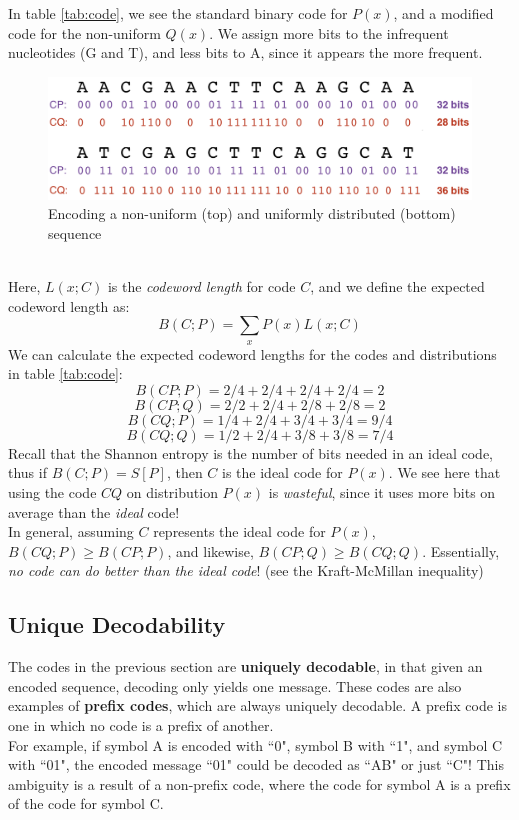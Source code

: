 \documentclass[12pt]{article}
\begin{document}
In table \ref{tab:code}, we see the standard binary code for $P(x)$, and a modified code for the non-uniform $Q(x)$. We assign more bits to the infrequent nucleotides (G and T), and less bits to A, since it appears the more frequent.
\begin{figure}[h]
    \centering
    \includegraphics[width=.7\linewidth]{ideal_code.png}
    \caption{Encoding a non-uniform (top) and uniformly distributed (bottom) sequence}
    \label{fig:my_label}
\end{figure}
\\Here, $L(x; C)$ is the \textit{codeword length} for code $C$, and we define the expected codeword length as:
$$B(C;P) = \sum_xP(x)L(x;C)$$
We can calculate the expected codeword lengths for the codes and distributions in table \ref{tab:code}:
$$B(CP;P) = 2/4 + 2/4 + 2/4 + 2/4 = 2$$
$$B(CP;Q) = 2/2 + 2/4 + 2/8 + 2/8 = 2$$
$$B(CQ;P) = 1/4 + 2/4 + 3/4 + 3/4 = 9/4$$
$$B(CQ;Q) = 1/2 + 2/4 + 3/8 + 3/8 = 7/4$$
Recall that the Shannon entropy is the number of bits needed in an ideal code, thus if $B(C;P) = S[P]$, then $C$ is the ideal code for $P(x)$. We see here that using the code $CQ$ on distribution $P(x)$ is \textit{wasteful}, since it uses more bits on average than the \textit{ideal} code!\\[10pt]
In general, assuming $C$ represents the ideal code for $P(x)$, $B(CQ; P) \geq B(CP;P)$, and likewise, $B(CP;Q) \geq B(CQ;Q)$. Essentially, \textit{no code can do better than the ideal code}! (see the Kraft-McMillan inequality)
\subsection{Unique Decodability}
The codes in the previous section are \textbf{uniquely decodable}, in that given an encoded sequence, decoding only yields one message. These codes are also examples of \textbf{prefix codes}, which are always uniquely decodable. A prefix code is one in which no code is a prefix of another.\\[10pt]
For example, if symbol A is encoded with ``0", symbol B with ``1", and symbol C with ``01", the encoded message ``01" could be decoded as ``AB" or just ``C"! This ambiguity is a result of a non-prefix code, where the code for symbol A is a prefix of the code for symbol C.
\end{document}
